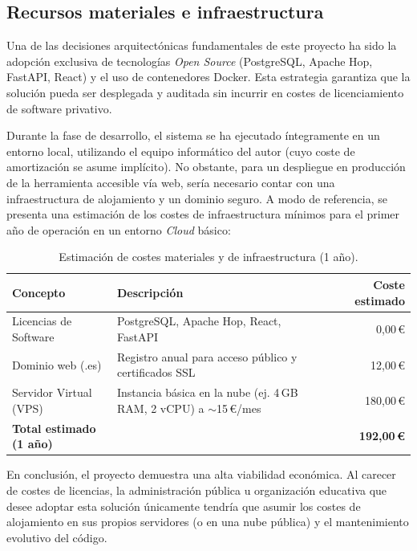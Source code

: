 \subsection{Recursos materiales e infraestructura}

Una de las decisiones arquitectónicas fundamentales de este proyecto ha sido la adopción exclusiva de tecnologías \textit{Open Source} (PostgreSQL, Apache Hop, FastAPI, React) y el uso de contenedores Docker. Esta estrategia garantiza que la solución pueda ser desplegada y auditada sin incurrir en costes de licenciamiento de software privativo.

Durante la fase de desarrollo, el sistema se ha ejecutado íntegramente en un entorno local, utilizando el equipo informático del autor (cuyo coste de amortización se asume implícito). No obstante, para un despliegue en producción de la herramienta accesible vía web, sería necesario contar con una infraestructura de alojamiento y un dominio seguro. A modo de referencia, se presenta una estimación de los costes de infraestructura mínimos para el primer año de operación en un entorno \textit{Cloud} básico:

\begin{table}[htbp]
    \caption{Estimación de costes materiales y de infraestructura (1 año).}
    \label{tab:costes_materiales}
    \centering
    \begin{tabular}{lp{6cm}r}
        \hline
        \textbf{Concepto} & \textbf{Descripción} & \textbf{Coste estimado} \\
        \hline
        Licencias de Software & PostgreSQL, Apache Hop, React, FastAPI & 0,00\,€ \\
        Dominio web (.es) & Registro anual para acceso público y certificados SSL & 12,00\,€ \\
        Servidor Virtual (VPS) & Instancia básica en la nube (ej. 4\,GB RAM, 2 vCPU) a $\sim$15\,€/mes & 180,00\,€ \\
        \hline
        \textbf{Total estimado (1 año)} & & \textbf{192,00\,€} \\
        \hline
    \end{tabular}
\end{table}

En conclusión, el proyecto demuestra una alta viabilidad económica. Al carecer de costes de licencias, la administración pública u organización educativa que desee adoptar esta solución únicamente tendría que asumir los costes de alojamiento en sus propios servidores (o en una nube pública) y el mantenimiento evolutivo del código.
